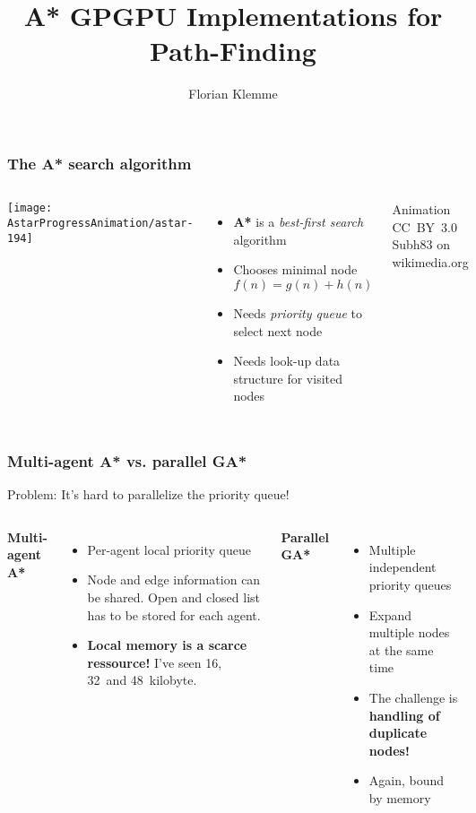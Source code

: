 \documentclass{beamer}
\begin{document}
\title{A* GPGPU Implementations for Path-Finding}
\author{Florian Klemme}
\frame{\titlepage}

\begin{frame}
    \frametitle{The A* search algorithm}
    \begin{columns}
        \texttt{[image: AstarProgressAnimation/astar-194]}
        
        \begin{itemize}
            \item \textbf{A*} is a \emph{best-first search} algorithm
            \item Chooses minimal node \(f(n) = g(n) + h(n)\)
            \item Needs \emph{priority queue} to select next node
            \item Needs look-up data structure for visited nodes
        \end{itemize}
        
        \vspace{1em}
        Animation CC~BY~3.0 Subh83 on wikimedia.org
    \end{columns}
\end{frame}

\begin{frame}
    \frametitle{Multi-agent A* vs. parallel GA*}
    Problem: It's hard to parallelize the priority queue!
    
    \vspace{1em}
    \begin{columns}[T]
        \textbf{Multi-agent A*}~\cite{silva2011gpu}
        \begin{itemize}
            \item Per-agent local priority queue
            \item Node and edge information can be shared. Open and closed list has to be stored for each agent.
            \item \textbf{Local memory is a scarce ressource!} I've seen 16, 32~and 48~kilobyte.
        \end{itemize}
        
        \textbf{Parallel GA*}~\cite{zhou2015massively}
        \begin{itemize}
            \item Multiple independent priority queues
            \item Expand multiple nodes at the same time
            \item The challenge is \textbf{handling of duplicate nodes!}
            \item Again, bound by memory
        \end{itemize}
    \end{columns}
\end{frame}
\end{document}
